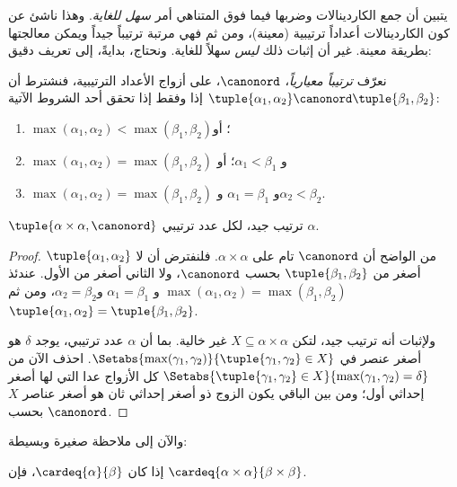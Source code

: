 \documentclass[../../../include/open-logic-section]{subfiles}
\begin{document}


يتبين أن جمع الكاردينالات وضربها فيما فوق المتناهي أمر
\emph{سهل للغاية}. وهذا ناشئ عن كون الكاردينالات أعداداً ترتيبية
(معينة)، ومن ثم فهي مرتبة ترتيباً جيداً ويمكن معالجتها بطريقة معينة.
غير أن إثبات ذلك \emph{ليس} سهلاً للغاية. ونحتاج، بدايةً، إلى تعريف
دقيق:

\begin{defn}
نعرّف \emph{ترتيباً معيارياً}، $\canonord$، على أزواج الأعداد
الترتيبية، فنشترط أن
$\tuple{\alpha_1, \alpha_2} \canonord
\tuple{\beta_1, \beta_2}$ إذا وفقط إذا تحقق أحد الشروط الآتية:
\begin{enumerate}
	\item $\max(\alpha_1, \alpha_2) < \max(\beta_1, \beta_2)$؛ أو
	\item $\max(\alpha_1, \alpha_2) = \max(\beta_1, \beta_2)$ و
	$\alpha_1 < \beta_1$؛ أو
	\item $\max(\alpha_1, \alpha_2) = \max(\beta_1, \beta_2)$ و
	$\alpha_1 = \beta_1$ و$\alpha_2 < \beta_2$.
\end{enumerate}
\end{defn}

\begin{lem}
$\tuple{\alpha \times \alpha, \canonord}$ ترتيب جيد، لكل عدد ترتيبي
$\alpha$.
\end{lem}

\begin{proof}
من الواضح أن $\canonord$ تام على $\alpha \times \alpha$. فلنفترض أن
لا $\tuple{\alpha_1, \alpha_2}$ أصغر من
$\tuple{\beta_1, \beta_2}$ بحسب $\canonord$، ولا الثاني أصغر من الأول.
عندئذ
$\max(\alpha_1, \alpha_2) = \max(\beta_1, \beta_2)$ و
$\alpha_1 = \beta_1$ و$\alpha_2 = \beta_2$، ومن ثم
$\tuple{\alpha_1, \alpha_2} = \tuple{\beta_1, \beta_2}$.

ولإثبات أنه ترتيب جيد، لتكن $X \subseteq \alpha\times\alpha$ غير
خالية. بما أن $\alpha$ عدد ترتيبي، يوجد $\delta$ هو أصغر عنصر في
$\Setabs{\max(\gamma_1, \gamma_2)}{\tuple{\gamma_1,
\gamma_2} \in X}$. احذف الآن من
$\Setabs{\tuple{\gamma_1,\gamma_2} \in X}{\max(\gamma_1, \gamma_2) =
\delta}$ كل الأزواج عدا التي لها أصغر إحداثي أول؛ ومن بين الباقي يكون
الزوج ذو أصغر إحداثي ثان هو أصغر عناصر $X$ بحسب $\canonord$.
\end{proof}
\noindent
والآن إلى ملاحظة صغيرة وبسيطة:

\begin{prop}
إذا كان $\cardeq{\alpha}{\beta}$، فإن
$\cardeq{\alpha \times \alpha}{\beta \times \beta}$.
\end{prop}
\end{document}

